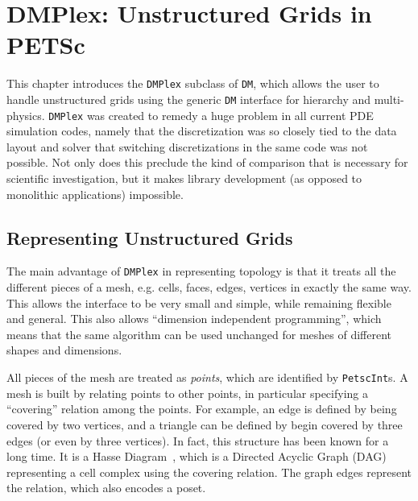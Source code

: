 {\chapter{DMPlex: Unstructured Grids in PETSc}
\label{ch_unstructured}

This chapter introduces the \lstinline{DMPlex} subclass of \lstinline{DM}, which allows the user to handle unstructured grids using the generic
\lstinline{DM} interface for hierarchy and multi-physics. \lstinline{DMPlex} was created to remedy a huge problem in all current PDE
simulation codes, namely that the discretization was so closely tied to the data layout and solver that switching
discretizations in the same code was not possible. Not only does this preclude the kind of comparison that is necessary
for scientific investigation, but it makes library development (as opposed to monolithic applications) impossible.

\medskip \medskip

\section{Representing Unstructured Grids} 

The main advantage of \lstinline{DMPlex} in representing topology is that it treats all the different pieces of a mesh,
e.g. cells, faces, edges, vertices in exactly the same way. This allows the interface to be very small and simple, while
remaining flexible and general. This also allows ``dimension independent programming'', which means that the same
algorithm can be used unchanged for meshes of different shapes and dimensions.

All pieces of the mesh are treated as \textit{points}, which are identified by \lstinline{PetscInt}s. A mesh is built by relating
points to other points, in particular specifying a ``covering'' relation among the points. For example, an edge is
defined by being covered by two vertices, and a triangle can be defined by begin covered by three edges (or even by
three vertices). In fact, this structure has been known for a long time. It is a Hasse Diagram~\cite{HasseDiagram},
which is a Directed Acyclic Graph (DAG) representing a cell complex using the covering relation. The graph edges
represent the relation, which also encodes a poset.

}
